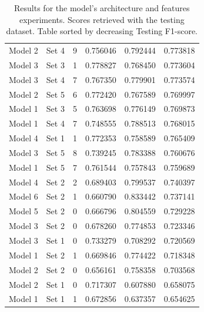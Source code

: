 \begin{table}[!h]
\begin{tabular}{c|c|c|c|c|c}
        Model 2  &	Set 4      &	9	    &	0.756046    &	0.792444    &	0.773818    \\
        Model 3  &	Set 3      &	1	    &	0.778827    &	0.768450    &	0.773604    \\
        Model 3  &	Set 4      &	7	    &	0.767350    &	0.779901    &	0.773574    \\
        Model 2  &	Set 5      &	6	    &	0.772420    &	0.767589    &	0.769997    \\
        Model 1  &	Set 3      &	5	    &	0.763698    &	0.776149    &	0.769873    \\
        Model 1  &	Set 4      &	7	    &	0.748555    &	0.788513    &	0.768015    \\
        Model 4  &	Set 1      &	1	    &	0.772353    &	0.758589    &	0.765409    \\
        Model 3  &	Set 5      &	8	    &	0.739245    &	0.783388    &	0.760676    \\
        Model 1  &	Set 5      &	7	    &	0.761544    &	0.757843    &	0.759689    \\
        Model 4  &	Set 2      &	2	    &	0.689403    &	0.799537    &	0.740397    \\
        Model 6  &	Set 2      &	1	    &	0.660790    &	0.833442    &	0.737141    \\
        Model 5  &	Set 2      &	0	    &	0.666796    &	0.804559    &	0.729228    \\
        Model 3  &	Set 2      &	0	    &	0.678260    &	0.774853    &	0.723346    \\
        Model 3  &	Set 1      &	0	    &	0.733279    &	0.708292    &	0.720569    \\
        Model 1  &	Set 2      &	1	    &	0.669846    &	0.774422    &	0.718348    \\
        Model 2  &	Set 2      &	0	    &	0.656161    &	0.758358    &	0.703568    \\
        Model 2  &	Set 1      &	0	    &	0.717307    &	0.607880    &	0.658075    \\
        Model 1  &	Set 1      &	1	    &	0.672856    &	0.637357    &	0.654625    \\
    \end{tabular}
    \caption[Results for neural network architecture and features experiments]{Results for the model's architecture and features experiments. Scores retrieved with the testing dataset. Table sorted by decreasing Testing F1-score.}
    \label{tab-annex:nn-experiments}
\end{table}




